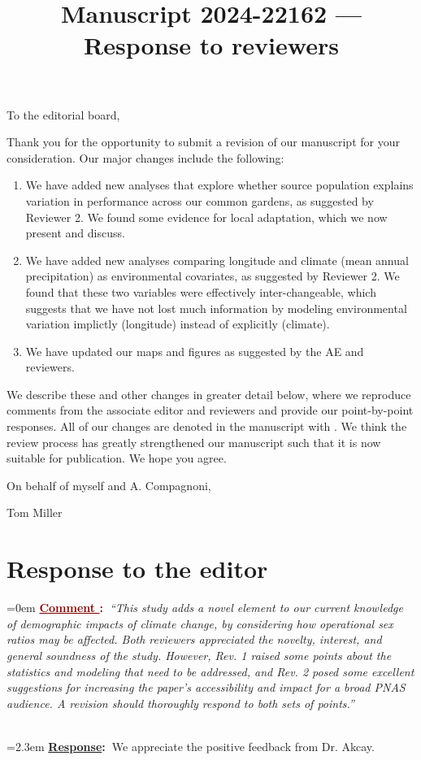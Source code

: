 \documentclass[12pt]{article}
\newcounter{cN}
\newcommand{\comment}[1]{
	\vspace{2em}
	\refstepcounter{cN} %
	\noindent \hangindent=0em \textbf{\textcolor{Maroon}{\uline{Comment \thecN}:~}}\emph{``#1''}
	}
\newcommand{\response}[1]{
	\\[0.25em]
	\hangindent=2.3em \textbf{\textcolor{NavyBlue}{\uline{Response}:~}}#1
	}
\newcommand{\revise}[1]{{\color{Mahogany}{#1}}}
\begin{document}
\title{Manuscript 2024-22162 --- Response to reviewers}

\maketitle
\noindent To the editorial board,

Thank you for the opportunity to submit a revision of our manuscript for your consideration. Our major changes include the following:
\begin{enumerate}
	\item We have added new analyses that explore whether source population explains variation in performance across our common gardens, as suggested by Reviewer 2. We found some evidence for local adaptation, which we now present and discuss. 
	\item We have added new analyses comparing longitude and climate (mean annual precipitation) as environmental covariates, as suggested by Reviewer 2. We found that these two variables were effectively inter-changeable, which suggests that we have not lost much information by modeling environmental variation implictly (longitude) instead of explicitly (climate).
	\item We have updated our maps and figures as suggested by the AE and reviewers.
\end{enumerate}

We describe these and other changes in greater detail below, where we reproduce comments from the associate editor and reviewers and provide our point-by-point responses. 
All of our changes are denoted in the manuscript with \revise{Mahogany font}.
We think the review process has greatly strengthened our manuscript such that it is now suitable for publication.
We hope you agree. 

\vspace{2em}
\hfill On behalf of myself and A. Compagnoni,

\hfill Tom Miller
\newpage

\section{Response to  the editor}
\vspace{-2em}

\comment{This study adds a novel element to our current knowledge of demographic impacts of climate change, by considering how operational sex ratios may be affected. Both reviewers appreciated the novelty, interest, and general soundness of the study. However, Rev. 1 raised some points about the statistics and modeling that need to be addressed, and Rev. 2 posed some excellent suggestions for increasing the paper's accessibility and impact for a broad PNAS audience. A revision should thoroughly respond to both sets of points.}
\response{We appreciate the positive feedback from Dr. Akcay.}
\end{document}
